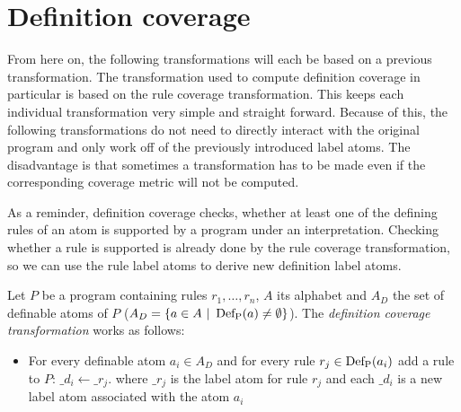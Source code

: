 \section{Definition coverage}
\label{sec:Computing coverage metrics for propositional programs/Definition coverage}
From here on, the following transformations will each be based on a previous transformation. The transformation used to compute definition coverage in particular is based on the rule coverage transformation. This keeps each individual transformation very simple and straight forward. Because of this, the following transformations do not need to directly interact with the original program and only work off of the previously introduced label atoms. The disadvantage is that sometimes a transformation has to be made even if the corresponding coverage metric will not be computed. 

As a reminder, definition coverage checks, whether at least one of the defining rules of an atom is supported by a program under an interpretation. Checking whether a rule is supported is already done by the rule coverage transformation, so we can use the rule label atoms to derive new definition label atoms.

\begin{definition}
\label{def:definition transformation}
    Let $P$ be a program containing rules \(r_1, \ldots, r_n\), $A$ its alphabet and $A_D$ the set of definable atoms of $P$ (\(A_D = \{a \in A\ |\ \operatorname{Def_P}(a) \neq \emptyset\}\)). The \emph{definition coverage transformation} works as follows:
    \begin{itemize}
        \item For every definable atom \(a_i \in A_D\) and for every rule \(r_j \in \operatorname{Def_P}(a_i)\) add a rule to $P$: \(\_d_i \leftarrow \_r_j.\) where $\_r_j$ is the label atom for rule $r_j$ and each $\_d_i$ is a new label atom associated with the atom $a_i$
    \end{itemize}
\end{definition}

